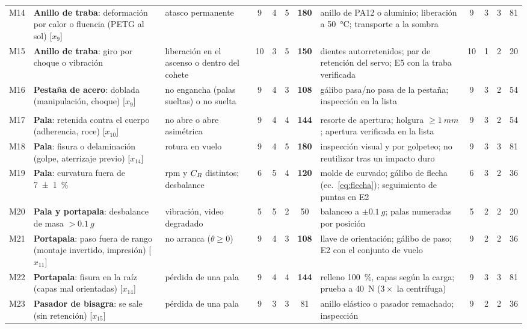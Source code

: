 {\begin{longtable}{@{}>{\raggedright\arraybackslash}p{0.55cm}>{\raggedright\arraybackslash}p{3.9cm}>{\raggedright\arraybackslash}p{2.6cm}cccc>{\raggedright\arraybackslash}p{4.18cm}cccc@{}}
M14 & \textbf{Anillo de traba}: deformación por calor o fluencia (PETG al sol) [$x_{9}$] & atasco permanente & 9 & 4 & 5 & \textbf{180} & anillo de PA12 o aluminio; liberación a \SI{50}{\celsius}; transporte a la sombra & 9 & 3 & 3 & 81\\
M15 & \textbf{Anillo de traba}: giro por choque o vibración & liberación en el ascenso o dentro del cohete & 10 & 3 & 5 & \textbf{150} & dientes autorretenidos; par de retención del servo; E5 con la traba verificada & 10 & 1 & 2 & 20\\
M16 & \textbf{Pestaña de acero}: doblada (manipulación, choque) [$x_{9}$] & no engancha (palas sueltas) o no suelta & 9 & 4 & 3 & \textbf{108} & gálibo pasa/no pasa de la pestaña; inspección en la lista & 9 & 3 & 2 & 54\\
\multicolumn{12}{@{}l}{\textbf{Rotor}}\\*
M17 & \textbf{Pala}: retenida contra el cuerpo (adherencia, roce) [$x_{10}$] & no abre o abre asimétrica & 9 & 4 & 4 & \textbf{144} & resorte de apertura; holgura $\ge\SI{1}{mm}$; apertura verificada en la lista & 9 & 3 & 2 & 54\\
M18 & \textbf{Pala}: fisura o delaminación (golpe, aterrizaje previo) [$x_{14}$] & rotura en vuelo & 9 & 4 & 5 & \textbf{180} & inspección visual y por golpeteo; no reutilizar tras un impacto duro & 9 & 3 & 3 & 81\\
M19 & \textbf{Pala}: curvatura fuera de \SI{7 \pm 1}{\percent} & rpm y $C_{R}$ distintos; desbalance & 6 & 5 & 4 & \textbf{120} & molde de curvado; gálibo de flecha (ec.~\ref{eq:flecha}); seguimiento de puntas en E2 & 6 & 3 & 2 & 36\\
M20 & \textbf{Pala y portapala}: desbalance de masa $>\SI{0.1}{g}$ & vibración, video degradado & 5 & 5 & 2 & 50 & balanceo a $\pm\SI{0.1}{g}$; palas numeradas por posición & 5 & 2 & 2 & 20\\
M21 & \textbf{Portapala}: paso fuera de rango (montaje invertido, impresión) [$x_{11}$] & no arranca ($\theta\ge0$) & 9 & 4 & 3 & \textbf{108} & llave de orientación; gálibo de paso; E2 con el conjunto de vuelo & 9 & 2 & 2 & 36\\
M22 & \textbf{Portapala}: fisura en la raíz (capas mal orientadas) [$x_{14}$] & pérdida de una pala & 9 & 4 & 4 & \textbf{144} & relleno \SI{100}{\percent}, capas según la carga; prueba a \SI{40}{N} ($3\times$ la centrífuga) & 9 & 3 & 3 & 81\\
M23 & \textbf{Pasador de bisagra}: se sale (sin retención) [$x_{15}$] & pérdida de una pala & 9 & 3 & 3 & 81 & anillo elástico o pasador remachado; inspección & 9 & 2 & 2 & 36\\

\end{longtable}}
